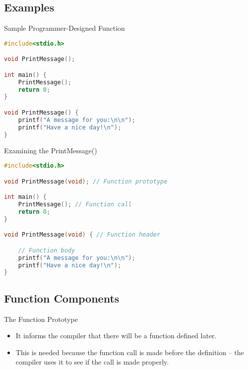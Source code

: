 \documentclass[graphics]{beamer}
\begin{document}
\subsection{Examples}
\begin{frame}[fragile]{Sample Programmer-Designed Function}
    \begin{lstlisting}[language=C,basicstyle=\footnotesize,keywordstyle=\color{blue},commentstyle=\color{green},showstringspaces=false,stringstyle=\color{red}]
#include<stdio.h>

void PrintMessage();

int main() {
    PrintMessage();
    return 0;
}

void PrintMessage() {
    printf("A message for you:\n\n");
    printf("Have a nice day!\n");
}
    \end{lstlisting}
\end{frame}

\begin{frame}[fragile]{Examining the PrintMessage()}
    \begin{lstlisting}[language=C,basicstyle=\footnotesize,keywordstyle=\color{blue},commentstyle=\color{green},showstringspaces=false,stringstyle=\color{red}]
#include<stdio.h>

void PrintMessage(void); // Function prototype

int main() {
    PrintMessage(); // Function call
    return 0;
}

void PrintMessage(void) { // Function header

    // Function body
    printf("A message for you:\n\n");
    printf("Have a nice day!\n");
}
    \end{lstlisting}
\end{frame}

\subsection{Function Components}
\begin{frame}{The Function Prototype}
    \begin{itemize}
        \item It informs the compiler that there will be a function defined later.
        \item This is needed because the function call is made before the definition -- the compiler uses it to see if the call is made properly.
    \end{itemize}
\end{frame}
\end{document}
